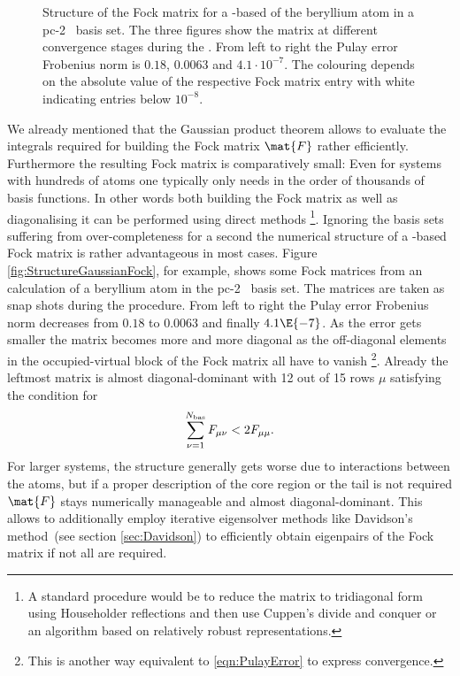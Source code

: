 \begin{sidewaysfigure}
	\centering
	\caption[Structure of the Fock matrix for a \cGTO-based \SCF]
		{Structure of the Fock matrix for a \cGTO-based \SCF
		of the beryllium atom
		in a pc-2~\cite{Jensen2007} basis set.
		The three figures show the matrix
		at different convergence stages during the \SCF.
		From left to right the Pulay error
		Frobenius norm is $0.18$, $0.0063$ and $4.1 \cdot 10^{-7}$.
		The colouring depends on the absolute value
		of the respective Fock matrix entry
		with white indicating entries below $10^{-8}$.
	}
	\label{fig:StructureGaussianFock}
\end{sidewaysfigure}
We already mentioned that the Gaussian product theorem
allows to evaluate the integrals
required for building the Fock matrix $\mat{F}$
rather efficiently.
Furthermore the resulting Fock matrix is comparatively small:
Even for systems with hundreds of atoms one typically only needs
in the order of thousands of basis functions.
In other words both building the Fock matrix
as well as diagonalising it can be performed using direct methods%
\noindent
\footnote{%
	A standard procedure would be to reduce the matrix to
	tridiagonal form using Householder reflections
	and then use Cuppen's divide and conquer
	or an algorithm based on relatively robust representations.
}.
Ignoring the basis sets suffering from over-completeness for a second
the numerical structure of a \cGTO-based Fock matrix
is rather advantageous in most cases.
Figure \vref{fig:StructureGaussianFock}, for example,
shows some Fock matrices from an \SCF calculation
of a beryllium atom
in the pc-2~\cite{Jensen2007} basis set.
The matrices are taken as snap shots during the \SCF procedure.
From left to right the Pulay error Frobenius norm decreases
from $0.18$ to $0.0063$ and finally $4.1\E{-7}$.
As the error gets smaller the matrix becomes more and more diagonal
as the off-diagonal elements in the occupied-virtual block of the
Fock matrix all have to vanish%
\footnote{This is another way equivalent to \eqref{eqn:PulayError}
to express \SCF convergence.}.
Already the leftmost matrix is almost diagonal-dominant with 12
out of 15 rows $\mu$
satisfying the condition for 
\[
	\sum_{\nu=1}^{N_\text{bas}} F_{\mu\nu} < 2 F_{\mu\mu}.
\]
For larger systems, the structure generally gets
worse due to interactions between the atoms,
but if a proper description of the core region or the tail is not required
$\mat{F}$ stays numerically manageable and almost diagonal-dominant.
This allows to additionally employ
iterative eigensolver methods like Davidson's method~(see section \vref{sec:Davidson})
to efficiently obtain eigenpairs of the Fock matrix if not all are required.

